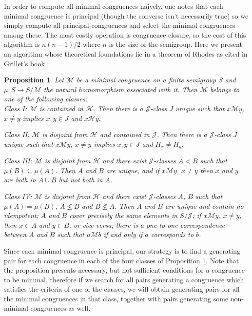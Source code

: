 \documentclass{acmconf}
\newtheorem{proposition}{Proposition}
\begin{document}
In order to compute all minimal congruences naively, 
one notes that each minimal congruence
is principal (though the converse isn't necessarily true) so we simply compute
all principal congruences and select the minimal congruences among these.
The most costly operation is congruence closure, 
so the cost of this  algorithm is $n(n-1)/2$ where $n$ is the size of 
the semigroup.
Here we present an algorithm 
whose theoretical foundations lie in 
a theorem of Rhodes \cite{pR67} as cited in Grillet's book
\cite[Theorem V.2.6]{bG95}:
\begin{proposition}\label{p:rhodes}
Let  $\mathscr{M}$ be a minimal congruence on a finite semigroup $S$ 
and $\mu : S \rightarrow S/\mathscr{M}$ the natural homomorphism
associated with it.  Then $\mathscr{M}$ belongs
to one of the following classes:\\

Class I: $\mathscr{M}$ is contained in $\mathscr{H}$. Then there is a 
$\mathscr{J}$-class $J$ unique such that $x \mathscr{M} y$, $x \neq y$
implies $x, y \in J$ and $x \mathscr{H} y$.

Class II: $\mathscr{M}$ is disjoint from $\mathscr{H}$ and contained in
$\mathscr{J}$. Then there is a $\mathscr{J}$-class $J$ unique such that
$x \mathscr{M} y$, $x \neq y$ implies $x, y \in J$ and 
$H_x \neq H_y$.

Class III: $\mathscr{M}$ is disjoint from $\mathscr{H}$
and there exist $\mathscr{J}$-classes $A < B$ such that 
$\mu(B) \subseteq \mu(A)$. Then $A$ and $B$ are unique, and if
$x \mathscr{M} y$, $x \neq y$ then $x$ and $y$ are both in 
$A \cup B$ but not both in $A$.


Class IV: $\mathscr{M}$ is disjoint from $\mathscr{H}$
and there exist $\mathscr{J}$-classes $A$, $B$ such that
$\mu(A) = \mu(B)$, $A \not\leq B$ and $B  \not\leq A$. 
Then $A$ and $B$ are unique and contain no idempotent; 
$A$ and $B$ cover precisely the same elements in $S/\mathscr{J}$;
if $x \mathscr{M} y$, $x \neq y$, then $x \in A$ and  $y \in B$, or vice
versa; there is a one-to-one correspondence between $A$ and $B$ such that
$a \mathscr{M} b$ if and only if $a$ corresponds to $b$.
\end{proposition}

Since each minimal congruence is principal, our strategy
is to find a generating pair for each congruence in each of the 
four classes of Proposition \ref{p:rhodes}.
Note that the proposition presents necessary, but not sufficient
conditions for a congruence to be minimal, therefore if we search 
for all pairs generating a congruence which
satisfies the criteria of one of the classes,
we will obtain generating pairs for
all the minimal congruences in that class, together
with pairs generating some non-minimal congruences as well. 
\end{document}
